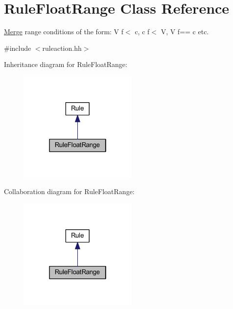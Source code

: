 \hypertarget{class_rule_float_range}{}\section{Rule\+Float\+Range Class Reference}
\label{class_rule_float_range}


\mbox{\hyperlink{class_merge}{Merge}} range conditions of the form\+: {\ttfamily V f$<$ c, c f$<$ V, V f== c} etc.  




{\ttfamily \#include $<$ruleaction.\+hh$>$}



Inheritance diagram for Rule\+Float\+Range\+:
\nopagebreak
\begin{figure}[H]
\begin{center}
\leavevmode
\includegraphics[width=166pt]{class_rule_float_range__inherit__graph}
\end{center}
\end{figure}


Collaboration diagram for Rule\+Float\+Range\+:
\nopagebreak
\begin{figure}[H]
\begin{center}
\leavevmode
\includegraphics[width=166pt]{class_rule_float_range__coll__graph}
\end{center}
\end{figure}
